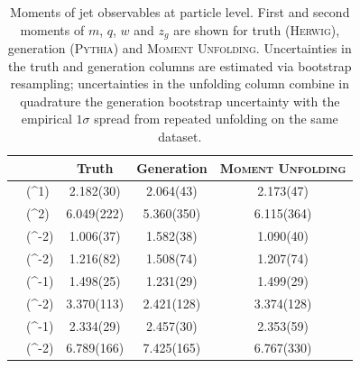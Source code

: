 \begin{table}
\centering
\caption[Moments of jet observables at particle level for Truth, Generation, and \textsc{Moment Unfolding}.]{Moments of jet observables at particle level. First and second moments of \(m\), \(q\), \(w\) and \(z_g\) are shown for truth (\textsc{Herwig}), generation (\textsc{Pythia}) and \textsc{Moment Unfolding}. Uncertainties in the truth and generation columns are estimated via bootstrap resampling; uncertainties in the unfolding column combine in quadrature the generation bootstrap uncertainty with the empirical \(1\sigma\) spread from repeated unfolding on the same dataset.}
\label{tab:inclusive-moments}
\begin{tabular}{@{}M M
  S[table-format=1.3(3)]
  S[table-format=1.3(3)]
  S[table-format=1.3(3)]@{}}
\toprule
&& {\textbf{Truth}} & {\textbf{Generation}} & {\textbf{\textsc{Moment Unfolding}}} \\
\midrule
\E[M]& (^1)     & 2.182(30)  & 2.064(43)  & 2.173(47)  \\
\E[M^2] &(^2)   & 6.049(222) & 5.360(350) & 6.115(364) \\
\midrule
\E[Q] &(^{-2})      & 1.006(37) & 1.582(38) & 1.090(40) \\
\E[Q^2]&(^{-2})   & 1.216(82) & 1.508(74) & 1.207(74) \\
\midrule
\E[W] &(^{-1})     & 1.498(25) & 1.231(29) & 1.499(29) \\
\E[W^2] &(^{-2})  & 3.370(113) & 2.421(128) & 3.374(128) \\
\midrule
\E[Z_g] &(^{-1})    & 2.334(29) & 2.457(30) & 2.353(59) \\
\E[Z_g^2]& (^{-2}) & 6.789(166) & 7.425(165) & 6.767(330) \\
\bottomrule
\end{tabular}
\end{table}